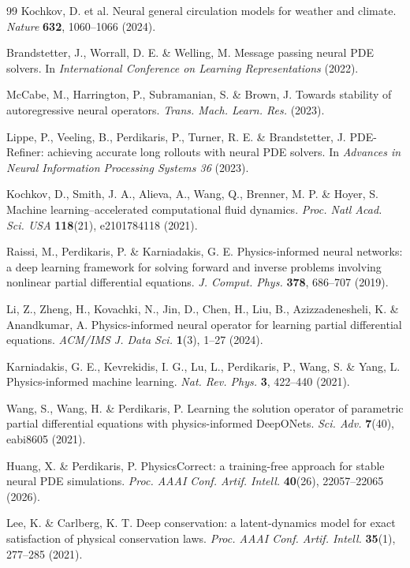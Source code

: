 \documentclass[11pt,a4paper]{article}
\begin{document}
\begin{thebibliography}{99}
 Kochkov, D. et al. Neural general circulation models for weather and climate. \emph{Nature} \textbf{632}, 1060--1066 (2024).

 Brandstetter, J., Worrall, D. E. \& Welling, M. Message passing neural PDE solvers. In \emph{International Conference on Learning Representations} (2022).

 McCabe, M., Harrington, P., Subramanian, S. \& Brown, J. Towards stability of autoregressive neural operators. \emph{Trans. Mach. Learn. Res.} (2023).

 Lippe, P., Veeling, B., Perdikaris, P., Turner, R. E. \& Brandstetter, J. PDE-Refiner: achieving accurate long rollouts with neural PDE solvers. In \emph{Advances in Neural Information Processing Systems 36} (2023).

 Kochkov, D., Smith, J. A., Alieva, A., Wang, Q., Brenner, M. P. \& Hoyer, S. Machine learning--accelerated computational fluid dynamics. \emph{Proc. Natl Acad. Sci. USA} \textbf{118}(21), e2101784118 (2021).

 Raissi, M., Perdikaris, P. \& Karniadakis, G. E. Physics-informed neural networks: a deep learning framework for solving forward and inverse problems involving nonlinear partial differential equations. \emph{J. Comput. Phys.} \textbf{378}, 686--707 (2019).

 Li, Z., Zheng, H., Kovachki, N., Jin, D., Chen, H., Liu, B., Azizzadenesheli, K. \& Anandkumar, A. Physics-informed neural operator for learning partial differential equations. \emph{ACM/IMS J. Data Sci.} \textbf{1}(3), 1--27 (2024).

 Karniadakis, G. E., Kevrekidis, I. G., Lu, L., Perdikaris, P., Wang, S. \& Yang, L. Physics-informed machine learning. \emph{Nat. Rev. Phys.} \textbf{3}, 422--440 (2021).

 Wang, S., Wang, H. \& Perdikaris, P. Learning the solution operator of parametric partial differential equations with physics-informed DeepONets. \emph{Sci. Adv.} \textbf{7}(40), eabi8605 (2021).

 Huang, X. \& Perdikaris, P. PhysicsCorrect: a training-free approach for stable neural PDE simulations. \emph{Proc. AAAI Conf. Artif. Intell.} \textbf{40}(26), 22057--22065 (2026).

 Lee, K. \& Carlberg, K. T. Deep conservation: a latent-dynamics model for exact satisfaction of physical conservation laws. \emph{Proc. AAAI Conf. Artif. Intell.} \textbf{35}(1), 277--285 (2021).


\end{thebibliography}
\end{document}

